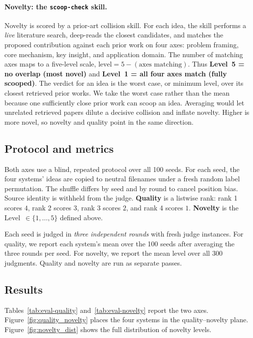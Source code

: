 \documentclass[10pt,a4paper]{article}
\begin{document}
\paragraph{Novelty: the \texttt{scoop-check} skill.} Novelty is scored by a prior-art collision skill. For each idea, the skill performs a \emph{live} literature search, deep-reads the closest candidates, and matches the proposed contribution against each prior work on four axes: problem framing, core mechanism, key insight, and application domain. The number of matching axes maps to a five-level scale, $\text{level} = 5 - (\text{axes matching})$. Thus \textbf{Level~5 = no overlap (most novel)} and \textbf{Level~1 = all four axes match (fully scooped)}. The verdict for an idea is the worst case, or minimum level, over its closest retrieved prior works. We take the worst case rather than the mean because one sufficiently close prior work can scoop an idea. Averaging would let unrelated retrieved papers dilute a decisive collision and inflate novelty. Higher is more novel, so novelty and quality point in the same direction.

\subsection{Protocol and metrics}
\label{subsec:eval-protocol}

Both axes use a blind, repeated protocol over all 100 seeds. For each seed, the four systems' ideas are copied to neutral filenames under a fresh random label permutation. The shuffle differs by seed and by round to cancel position bias. Source identity is withheld from the judge. \textbf{Quality} is a listwise rank: rank 1 scores $4$, rank 2 scores $3$, rank 3 scores $2$, and rank 4 scores $1$. \textbf{Novelty} is the Level~$\in\{1,\dots,5\}$ defined above.

Each seed is judged in \emph{three independent rounds} with fresh judge instances. For quality, we report each system's mean over the 100 seeds after averaging the three rounds per seed. For novelty, we report the mean level over all 300 judgments. Quality and novelty are run as separate passes.

\subsection{Results}
\label{subsec:eval-results}

Tables~\ref{tab:eval-quality} and~\ref{tab:eval-novelty} report the two axes. Figure~\ref{fig:quality_novelty} places the four systems in the quality--novelty plane. Figure~\ref{fig:novelty_dist} shows the full distribution of novelty levels.
\end{document}
